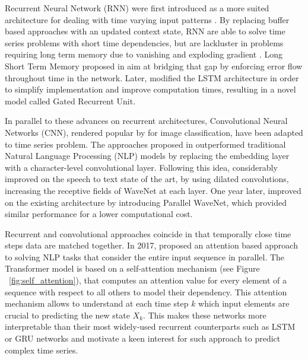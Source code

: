 \documentclass[12pt]{article}
\begin{document}
Recurrent Neural Network (RNN) were first introduced as a more suited architecture for dealing with time varying input patterns \cite{Mozer1989AFB}. By replacing buffer based approaches with an updated context state, RNN are able to solve time series problems with short time dependencies, but are lackluster in problems requiring long term memory due to vanishing and exploding gradient \cite{Bengio1994LearningLD}. Long Short Term Memory proposed in \cite{Hochreiter1997LongSM} aim at bridging that gap by enforcing error flow throughout time in the network. Later, \cite{Cho2014LearningPR} modified the LSTM architecture in order to simplify implementation and improve computation times, resulting in a novel model called Gated Recurrent Unit.

In parallel to these advances on recurrent architectures, Convolutional Neural Networks (CNN), rendered popular by \cite{Krizhevsky2012ImageNetCW} for image classification, have been adapted to time series problem. The approaches proposed in \cite{Jzefowicz2016ExploringTL,Kim2016CharacterAwareNL} outperformed traditional Natural Language Processing (NLP) models by replacing the embedding layer with a character-level convolutional layer. Following this idea, \cite{Oord2016WaveNetAG} considerably improved on the speech to text state of the art, by using dilated convolutions, increasing the receptive fields of WaveNet at each layer. One year later, \cite{Oord2017ParallelWF} improved on the existing architecture by introducing Parallel WaveNet, which provided similar performance for a lower computational cost.

Recurrent and convolutional approaches coincide in that temporally close time steps data are matched together. In 2017, \cite{Vaswani2017AttentionIA} proposed an attention based approach to solving NLP tasks that consider the entire input sequence in parallel. The Transformer model is based on a self-attention mechanism (see Figure ~\ref{fig:self_attention}), that computes an attention value for every element of a sequence with respect to all others to model their dependency. This attention mechanism allows to understand at each time step $k$ which input elements are crucial to predicting the new state $X_k$. This makes these networks more interpretable than their most widely-used recurrent counterparts such as LSTM or GRU networks and motivate a keen interest for such approach to predict complex time series.
\end{document}
